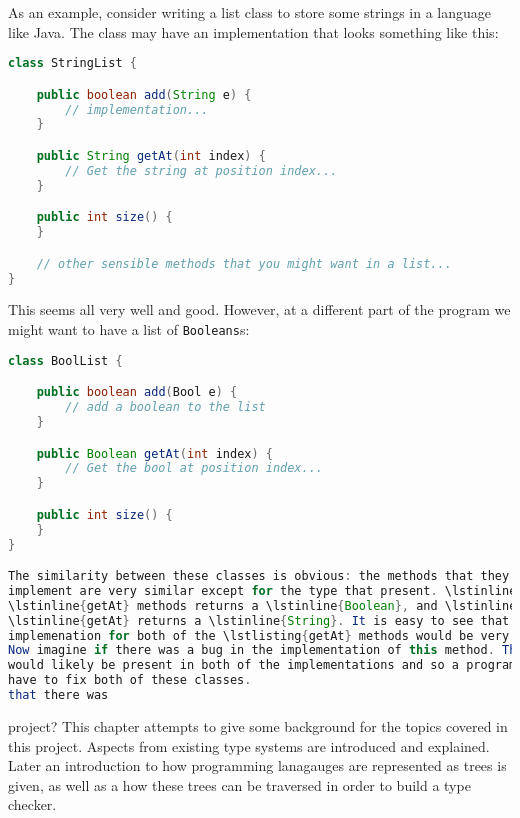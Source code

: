 As an example, consider writing a list class to store some strings in a
language like Java. The class may have an implementation that looks something like
this:

\begin{lstlisting}[caption=String List in Java, language=Java, label={lst:javastringlist}]
class StringList {

    public boolean add(String e) {
        // implementation...
    }

    public String getAt(int index) {
        // Get the string at position index...
    }

    public int size() {
    }

    // other sensible methods that you might want in a list...
}
\end{lstlisting}

This seems all very well and good. However, at a different part of the program
we might want to have a list of \lstinline{Booleans}s:

\begin{lstlisting}[caption=A very similar class, language=Java, label={lst:javaboolist}]
class BoolList {

    public boolean add(Bool e) {
        // add a boolean to the list
    }

    public Boolean getAt(int index) {
        // Get the bool at position index...
    }

    public int size() {
    }
}

The similarity between these classes is obvious: the methods that they
implement are very similar except for the type that present. \lstinline{BoolList}'s
\lstinline{getAt} methods returns a \lstinline{Boolean}, and \lstinline{StringList}'s
\lstinline{getAt} returns a \lstinline{String}. It is easy to see that the
implemenation for both of the \lstlisting{getAt} methods would be very similar.
Now imagine if there was a bug in the implementation of this method. This bug
would likely be present in both of the implementations and so a programmer would
have to fix both of these classes. 
that there was 
\end{lstlisting}

project?
This chapter attempts to give some background for the topics covered in this
project. Aspects from existing type systems are introduced and explained.
Later an introduction to how programming lanagauges are represented as trees is
given, as well as a how these trees can be traversed in order to build a type 
checker. 

